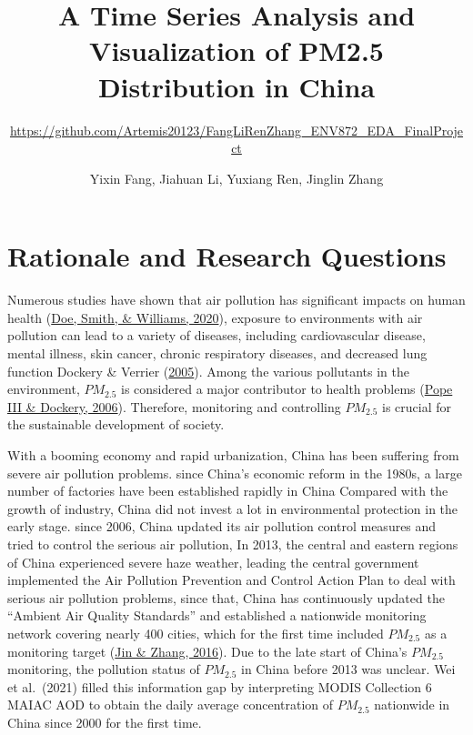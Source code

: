 \documentclass[
  12pt,
]{article}
\title{A Time Series Analysis and Visualization of PM2.5 Distribution in
China}
\subtitle{\url{https://github.com/Artemis20123/FangLiRenZhang_ENV872_EDA_FinalProject}}
\author{Yixin Fang, Jiahuan Li, Yuxiang Ren, Jinglin Zhang}
\date{}
\begin{document}
\maketitle

\newpage
\tableofcontents 
\newpage
\listoftables 
\newpage
\listoffigures 
\newpage

\hypertarget{rationale-and-research-questions}{%
\section{Rationale and Research
Questions}\label{rationale-and-research-questions}}

Numerous studies have shown that air pollution has significant impacts
on human health (\protect\hyperlink{ref-intro1}{Doe, Smith, \& Williams,
2020}), exposure to environments with air pollution can lead to a
variety of diseases, including cardiovascular disease, mental illness,
skin cancer, chronic respiratory diseases, and decreased lung function
Dockery \& Verrier (\protect\hyperlink{ref-intro3}{2005}). Among the
various pollutants in the environment, \(PM_{2.5}\) is considered a
major contributor to health problems
(\protect\hyperlink{ref-intro4}{Pope III \& Dockery, 2006}). Therefore,
monitoring and controlling \(PM_{2.5}\) is crucial for the sustainable
development of society.

With a booming economy and rapid urbanization, China has been suffering
from severe air pollution problems. since China's economic reform in the
1980s, a large number of factories have been established rapidly in
China Compared with the growth of industry, China did not invest a lot
in environmental protection in the early stage. since 2006, China
updated its air pollution control measures and tried to control the
serious air pollution, In 2013, the central and eastern regions of China
experienced severe haze weather, leading the central government
implemented the Air Pollution Prevention and Control Action Plan to deal
with serious air pollution problems, since that, China has continuously
updated the ``Ambient Air Quality Standards'' and established a
nationwide monitoring network covering nearly 400 cities, which for the
first time included \(PM_{2.5}\) as a monitoring target
(\protect\hyperlink{ref-intro5}{Jin \& Zhang, 2016}). Due to the late
start of China's \(PM_{2.5}\) monitoring, the pollution status of
\(PM_{2.5}\) in China before 2013 was unclear. Wei et al.~(2021) filled
this information gap by interpreting MODIS Collection 6 MAIAC AOD to
obtain the daily average concentration of \(PM_{2.5}\) nationwide in
China since 2000 for the first time.
\end{document}
